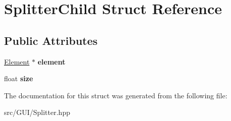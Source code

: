 \hypertarget{struct_splitter_child}{}\section{Splitter\+Child Struct Reference}
\label{struct_splitter_child}
\subsection*{Public Attributes}
\begin{DoxyCompactItemize}
\item 
\mbox{\label{struct_splitter_child_aca1e3e626b40621df7cbf4eb084fd82d}} 
\hyperlink{class_element}{Element} $\ast$ {\bfseries element}
\item 
\mbox{\label{struct_splitter_child_a4d6ca3e1ca70ed7e931990bc95161c66}} 
float {\bfseries size}
\end{DoxyCompactItemize}


The documentation for this struct was generated from the following file\+:\begin{DoxyCompactItemize}
\item 
src/\+G\+U\+I/Splitter.\+hpp\end{DoxyCompactItemize}
